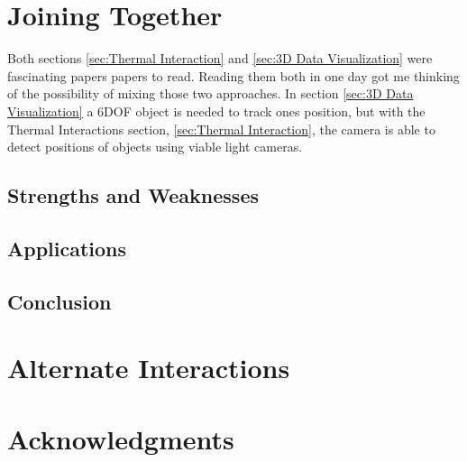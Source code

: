 \documentclass{sig-alternate}
\begin{document}
\section{Joining Together}
\label{sec:Joining Together}
Both sections \ref{sec:Thermal Interaction} and \ref{sec:3D Data Visualization} were fascinating papers papers to read. Reading them both in one day got me thinking of the possibility of mixing those two approaches. In section \ref{sec:3D Data Visualization} a 6DOF object is needed to track ones position, but with the Thermal Interactions section, \ref{sec:Thermal Interaction}, the camera is able to detect positions of objects using viable light cameras.  

\subsection{Strengths and Weaknesses}
\label{Strengths and Weaknesses}

\subsection{Applications}
\label{Applications}

\subsection{Conclusion}
\label{Conclusion}

\section{Alternate Interactions}
\label{sec:Alternate Interactions}

\section{Acknowledgments}
\label{sec:Acknowledgments}



\end{document}
